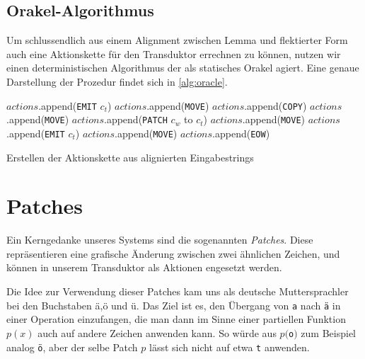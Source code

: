 \documentclass[11pt,a4paper]{article}
\newcommand{\action}[1]{\texttt{#1}}
\begin{document}
\subsection{Orakel-Algorithmus}
\label{sec:orakel-alg}
Um schlussendlich aus einem Alignment zwischen Lemma und flektierter Form auch eine Aktionskette für den Transduktor errechnen zu können, nutzen wir einen deterministischen Algorithmus der als statisches Orakel agiert. Eine genaue Darstellung der Prozedur findet sich in \autoref{alg:oracle}.

\begin{algorithm}[htb]
\begin{algorithmic}
    	\STATE $actions$.append(\action{EMIT} $c_t$)
    	\STATE $actions$.append(\action{MOVE})
    	\STATE $actions$.append(\action{COPY})
        \STATE $actions$.append(\action{MOVE})
    	\STATE $actions$.append(\action{PATCH} $c_w$ to $c_t$)
        \STATE $actions$.append(\action{MOVE})
    	\STATE $actions$.append(\action{EMIT} $c_t$)
        \STATE $actions$.append(\action{MOVE})
    \ENDIF
\ENDFOR
\STATE $actions$.append(\action{EOW})
\end{algorithmic}
\caption{Erstellen der Aktionskette aus alignierten Eingabestrings}
\label{alg:oracle}
\end{algorithm}

\section{Patches}
\label{sec:patches}
Ein Kerngedanke unseres Systems sind die sogenannten \textit{Patches}. Diese repräsentieren eine grafische Änderung zwischen zwei ähnlichen Zeichen, und können in unserem Transduktor als Aktionen engesetzt werden.

Die Idee zur Verwendung dieser Patches kam uns als deutsche Muttersprachler bei den Buchstaben ä,ö und ü. Das Ziel ist es, den Übergang von \texttt{a} nach \texttt{ä} in einer Operation einzufangen, die man dann im Sinne einer partiellen Funktion $p(x)$ auch auf andere Zeichen anwenden kann. So würde aus $p($\texttt{o}$)$ zum Beispiel analog \texttt{ö}, aber der selbe Patch $p$ lässt sich nicht auf etwa \texttt{t} anwenden.
\end{document}
